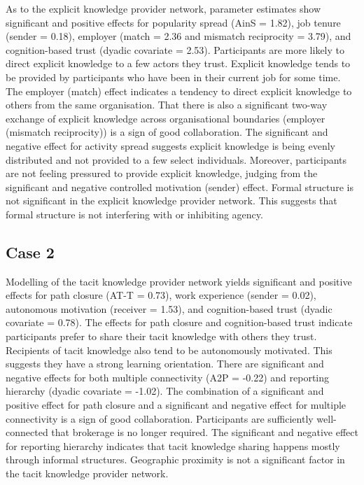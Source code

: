 As to the explicit knowledge provider network, parameter estimates show significant and positive effects for popularity spread (AinS = 1.82), job tenure (sender = 0.18), employer (match = 2.36 and mismatch reciprocity = 3.79), and cognition-based trust (dyadic covariate = 2.53). Participants are more likely to direct explicit knowledge to a few actors they trust. Explicit knowledge tends to be provided by participants who have been in their current job for some time. The employer (match) effect indicates a tendency to direct explicit knowledge to others from the same organisation. That there is also a significant two-way exchange of explicit knowledge across organisational boundaries (employer (mismatch reciprocity)) is a sign of good collaboration. The significant and negative effect for activity spread suggests explicit knowledge is being evenly distributed and not provided to a few select individuals. Moreover, participants are not feeling pressured to provide explicit knowledge, judging from the significant and negative controlled motivation (sender) effect. Formal structure is not significant in the explicit knowledge provider network. This suggests that formal structure is not interfering with or inhibiting agency. \medskip 

\subsection{Case 2}

Modelling of the tacit knowledge provider network yields significant and positive effects for path closure (AT-T = 0.73), work experience (sender = 0.02), autonomous motivation (receiver = 1.53), and cognition-based trust (dyadic covariate = 0.78). The effects for path closure and cognition-based trust indicate participants prefer to share their tacit knowledge with others they trust. Recipients of tacit knowledge also tend to be autonomously motivated. This suggests they have a strong learning orientation. There are significant and negative effects for both multiple connectivity (A2P = -0.22) and reporting hierarchy (dyadic covariate = -1.02). The combination of a significant and positive effect for path closure and a significant and negative effect for multiple connectivity is a sign of good collaboration. Participants are sufficiently well-connected that brokerage is no longer required. The significant and negative effect for reporting hierarchy indicates that tacit knowledge sharing happens mostly through informal structures. Geographic proximity is not a significant factor in the tacit knowledge provider network. \medskip

